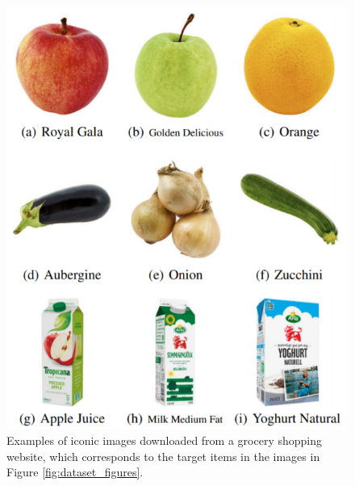 \begin{figure}[t]
\begin{minipage}[b]{0.47\textwidth}
	    \includegraphics[scale=0.5]{PaperB/figures_and_tables/figure2.png}
		\caption{Examples of iconic images downloaded from a grocery shopping website, which corresponds to the target items in the images in Figure \ref{fig:dataset_figures}. \newline}
		\label{fig:iconic_image_figures}
	\end{minipage} 
	\vspace{-2mm}
\end{figure}



